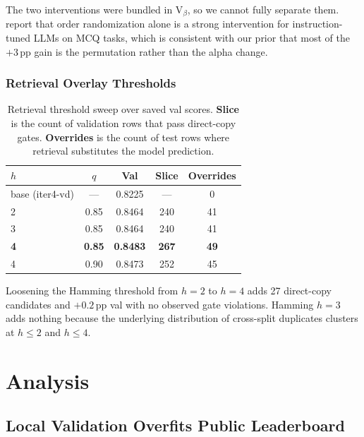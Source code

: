 \documentclass[11pt]{article}
\begin{document}
The two interventions were bundled in V$_\beta$, so we cannot fully separate them. \citet{pezeshkpour2023sensitivity} report that order randomization alone is a strong intervention for instruction-tuned LLMs on MCQ tasks, which is consistent with our prior that most of the $+3$\,pp gain is the permutation rather than the alpha change.

\subsubsection{Retrieval Overlay Thresholds}

\begin{table}[t]
\small
\begin{tabular}{@{}lcccc@{}}
\toprule
\textbf{$h$} & \textbf{$q$} & \textbf{Val} & \textbf{Slice} & \textbf{Overrides} \\
\midrule
base (iter4-vd) & --- & 0.8225 & --- & 0 \\
2 & 0.85 & 0.8464 & 240 & 41 \\
3 & 0.85 & 0.8464 & 240 & 41 \\
\textbf{4} & \textbf{0.85} & \textbf{0.8483} & \textbf{267} & \textbf{49} \\
4 & 0.90 & 0.8473 & 252 & 45 \\
\bottomrule
\end{tabular}
\caption{Retrieval threshold sweep over saved val scores. \textbf{Slice} is the count of validation rows that pass direct-copy gates. \textbf{Overrides} is the count of test rows where retrieval substitutes the model prediction.}
\label{tab:retrieval}
\end{table}

Loosening the Hamming threshold from $h=2$ to $h=4$ adds 27 direct-copy candidates and $+0.2$\,pp val with no observed gate violations. Hamming $h=3$ adds nothing because the underlying distribution of cross-split duplicates clusters at $h \le 2$ and $h \le 4$.

\section{Analysis}

\subsection{Local Validation Overfits Public Leaderboard}
\label{sec:overfit-val}
\end{document}
